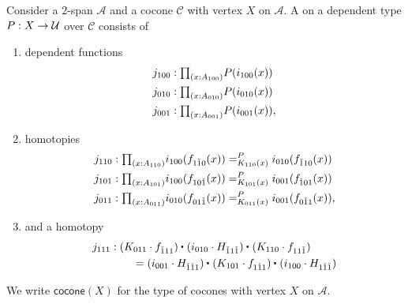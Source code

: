 \begin{defn}
Consider a $2$-span $\mathcal{A}$ and a cocone $\mathcal{C}$ with vertex $X$ on $\mathcal{A}$. A  on a dependent type $P:X\to\mathcal{U}$ over $\mathcal{C}$ consists of
\begin{enumerate}
\item dependent functions
\begin{align*}
j_{100} & : \prd{x:A_{100}}P(i_{100}(x))\\
j_{010} & : \prd{x:A_{010}}P(i_{010}(x))\\
j_{001} & : \prd{x:A_{001}}P(i_{001}(x)),
\end{align*}
\item homotopies
\begin{align*}
j_{110} & : \prd{x:A_{110}} \dpath{P}{K_{110}(x)}{i_{100}(f_{1\check{1}0}(x))}{i_{010}(f_{\check{1}10}(x))} \\
j_{101} & : \prd{x:A_{101}} \dpath{P}{K_{101}(x)}{i_{100}(f_{10\check{1}}(x))}{i_{001}(f_{\check{1}01}(x))} \\
j_{011} & : \prd{x:A_{011}} \dpath{P}{K_{011}(x)}{i_{010}(f_{01\check{1}}(x))}{i_{001}(f_{0\check{1}1}(x))},
\end{align*}
\item and a homotopy
\begin{align*}
j_{111} & : \ct{(K_{011}\cdot f_{\check{1}11})}{(i_{010}\cdot H_{\check{1}1\check{1}})}{(K_{110}\cdot f_{11\check{1}})} \\
& \qquad = \ct{(i_{001}\cdot H_{\check{1}\check{1}1})}{(K_{101}\cdot f_{1\check{1}1})}{(i_{100}\cdot H_{1\check{1}\check{1}})}
\end{align*}
\end{enumerate}
We write $\mathsf{cocone}(X)$ for the type of cocones with vertex $X$ on $\mathcal{A}$.
\end{defn}


